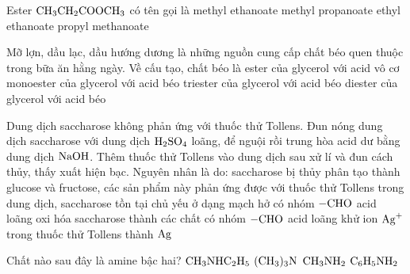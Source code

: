 \documentclass[11pt,a4paper]{article}
\begin{document}
\begin{ex}
Ester $\ce{CH3CH2COOCH3}$ có tên gọi là
\choice
{methyl ethanoate}
{\True methyl propanoate}
{ethyl ethanoate}
{propyl methanoate}



\end{ex}

\begin{ex}
Mỡ lợn, dầu lạc, dầu hướng dương là những nguồn cung cấp chất béo quen thuộc trong bữa ăn hằng ngày. Về cấu tạo, chất béo là
\choice
{ester của glycerol với acid vô cơ}
{monoester của glycerol với acid béo}
{\True triester của glycerol với acid béo}
{diester của glycerol với acid béo}



\end{ex}

\begin{ex}
Dung dịch saccharose không phản ứng với thuốc thử Tollens. Đun nóng dung dịch saccharose với dung dịch $\ce{H2SO4}$ loãng, để nguội rồi trung hòa acid dư bằng dung dịch $\ce{NaOH}$. Thêm thuốc thử Tollens vào dung dịch sau xử lí và đun cách thủy, thấy xuất hiện bạc. Nguyên nhân là do:
\choice
{\True saccharose bị thủy phân tạo thành glucose và fructose, các sản phẩm này phản ứng được với thuốc thử Tollens}
{trong dung dịch, saccharose tồn tại chủ yếu ở dạng mạch hở có nhóm $\ce{-CHO}$}
{acid loãng oxi hóa saccharose thành các chất có nhóm $\ce{-CHO}$}
{acid loãng khử ion $\ce{Ag+}$ trong thuốc thử Tollens thành $\ce{Ag}$}



\end{ex}

\begin{ex}
Chất nào sau đây là amine bậc hai?
\choice
{\True $\ce{CH3NHC2H5}$}
{$\ce{(CH3)3N}$}
{$\ce{CH3NH2}$}
{$\ce{C6H5NH2}$}



\end{ex}
\end{document}
